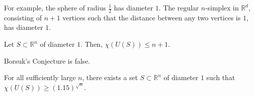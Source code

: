 For example, the sphere of radius \(\frac{1}{2}\) has diameter \(1\).
The regular \(n\)-simplex in \(\mathbb{R}^d\), consisting of \(n+1\) vertices such that the distance between any two vertices is \(1\), has diameter \(1\).

\begin{conjecture}
    Let \(S \subset \mathbb{R}^n\) of diameter \(1\).
    Then, \(\chi(U(S)) \leq n+1\).
\end{conjecture}

Borsuk's Conjecture is false.

\begin{theorem}
    For all sufficiently large \(n\),
    there exists a set \(S \subset \mathbb{R}^n\) of diameter \(1\) such that \(\chi(U(S)) \geq (1.15)^{\sqrt{n}}\).
\end{theorem}

